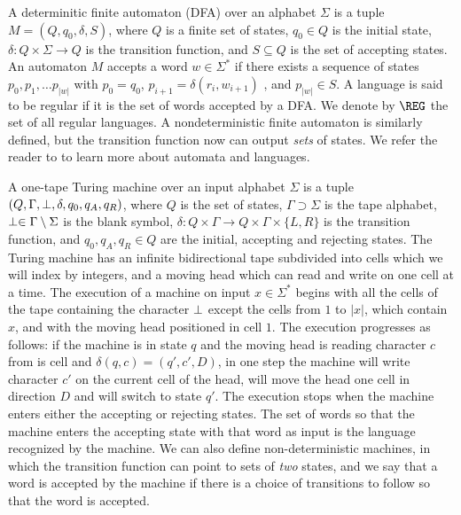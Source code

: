 A determinitic finite automaton (DFA) over an alphabet $\Sigma$ is a tuple $M = (Q, q_0, \delta, S)$, 
where $Q$ is a finite set of states, $q_0 \in Q$ is the initial state, 
$\delta \colon Q \times \Sigma \to Q$ is the transition function, and $S \subseteq Q$ is the 
set of accepting states. An automaton $M$ accepts a word $w \in \Sigma^*$ if there exists a sequence
of states $p_0, p_1, \ldots p_{|w|}$ with $p_0 = q_0$, $p_{i+1} = \delta(r_i, w_{i+1})$ , and 
$p_{|w|} \in S$. A language is said to be regular if it is the set of words accepted by a 
DFA. We denote by $\REG$ the set of all regular languages.
A nondeterministic finite automaton is similarly defined, but the transition function now 
can output \emph{sets} of states. We refer the reader to \cite{HopcroftUllman} to learn more about
automata and languages. 

A one-tape Turing machine over an input alphabet $\Sigma$ is a tuple $(Q, \Gamma, \perp, 
\delta, q_0, q_A, q_R)$, where $Q$ is the set of states, $\Gamma \supset \Sigma$ is the tape alphabet,
$\perp \in \Gamma \setminus \Sigma$ is the blank symbol, 
$\delta \colon Q \times \Gamma \to Q \times \Gamma \times \{L, R\}$ is the transition function, and
$q_0, q_A, q_R \in Q$ are the initial, accepting and rejecting states. The Turing machine 
has an infinite bidirectional tape subdivided into cells which we will index by integers, 
and a moving head which can read and write on one cell at a time. 
The execution of a machine on input $x \in \Sigma^*$ begins with all the 
cells of the tape containing the character $\perp$ except the cells from
$1$ to $|x|$, which contain $x$, and with the moving head positioned in cell $1$.
The execution progresses as follows: if the machine is in state $q$ and the 
moving head is reading character $c$ from is cell and $\delta(q, c) = (q', c', D)$,
in one step the machine will write character $c'$ on the current cell of the head,
will move the head one cell in direction $D$ and will switch to state $q'$. 
The execution stops when the machine enters either the accepting or rejecting 
states. The set of words so that the machine enters the accepting state with that 
word as input is the language recognized by the machine. We can also define non-deterministic
machines, in which the transition function can point to sets of \emph{two} states, and 
we say that a word is accepted by the machine if there is a choice of transitions to follow
so that the word is accepted. 

